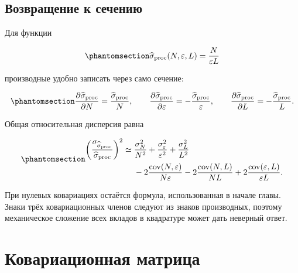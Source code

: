 \documentclass[
  russian,
  11pt,
  a4paper,
  open=any]{scrbook}
\begin{document}
\subsection{Возвращение к
сечению}\label{ux432ux43eux437ux432ux440ux430ux449ux435ux43dux438ux435-ux43a-ux441ux435ux447ux435ux43dux438ux44e}

Для функции

\begin{equation}\protect\phantomsection\label{eq-ch6-cross-section-function}{
\widehat\sigma_{\mathrm{proc}}(N,\varepsilon,L)
=\frac{N}{\varepsilon L}
}\end{equation}

производные удобно записать через само сечение:

\begin{equation}\protect\phantomsection\label{eq-ch6-cross-section-derivatives}{
\frac{\partial\widehat\sigma_{\mathrm{proc}}}{\partial N}
=\frac{\widehat\sigma_{\mathrm{proc}}}{N},
\qquad
\frac{\partial\widehat\sigma_{\mathrm{proc}}}{\partial\varepsilon}
=-\frac{\widehat\sigma_{\mathrm{proc}}}{\varepsilon},
\qquad
\frac{\partial\widehat\sigma_{\mathrm{proc}}}{\partial L}
=-\frac{\widehat\sigma_{\mathrm{proc}}}{L}.
}\end{equation}

Общая относительная дисперсия равна

\begin{equation}\protect\phantomsection\label{eq-ch6-cross-section-full-uncertainty}{
\begin{aligned}
\left(
\frac{\sigma_{\widehat\sigma_{\mathrm{proc}}}}
     {\widehat\sigma_{\mathrm{proc}}}
\right)^2
\simeq{}
&\frac{\sigma_N^2}{N^2}
+\frac{\sigma_\varepsilon^2}{\varepsilon^2}
+\frac{\sigma_L^2}{L^2}\\
&-2\frac{\operatorname{cov}(N,\varepsilon)}{N\varepsilon}
-2\frac{\operatorname{cov}(N,L)}{NL}
+2\frac{\operatorname{cov}(\varepsilon,L)}{\varepsilon L}.
\end{aligned}
}\end{equation}

При нулевых ковариациях остаётся формула, использованная в начале главы.
Знаки трёх ковариационных членов следуют из знаков производных, поэтому
механическое сложение всех вкладов в квадратуре может дать неверный
ответ.

\section{Ковариационная
матрица}\label{ux43aux43eux432ux430ux440ux438ux430ux446ux438ux43eux43dux43dux430ux44f-ux43cux430ux442ux440ux438ux446ux430}
\end{document}
